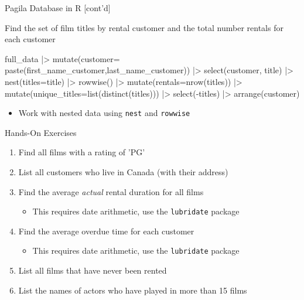 \documentclass[ignorenonframetext,xcolor=x11names]{beamer}
\begin{document}
\begin{frame}[fragile]{Pagila Database in R \small [cont'd]}

Find the set of film titles by rental customer and the total number rentals for each customer

\footnotesize
\begin{Rcode}
full_data |>
  mutate(customer=
    paste(first_name_customer,last_name_customer)) |>
  select(customer, title) |>
  nest(titles=title) |>
  rowwise() |> 
  mutate(rentals=nrow(titles)) |>
  mutate(unique_titles=list(distinct(titles))) |>
  select(-titles) |>
  arrange(customer)
\end{Rcode}
\normalsize

\begin{itemize}
  \item Work with nested data using \texttt{nest} and \texttt{rowwise}
\end{itemize}
\end{frame}


\begin{frame}{Hands-On Exercises}
\begin{enumerate}
  \item Find all films with a rating of 'PG'
  \item List all customers who live in Canada (with their address)
  \item Find the average \emph{actual} rental duration for all films
  \begin{itemize}
     \item This requires date arithmetic, use the \texttt{lubridate} package
  \end{itemize}
  \item Find the average overdue time for each customer
  \begin{itemize}
     \item This requires date arithmetic, use the \texttt{lubridate} package
  \end{itemize}
  \item List all films that have never been rented
  \item List the names of actors who have played in more than 15 films
\end{enumerate}
\end{frame}
\end{document}
